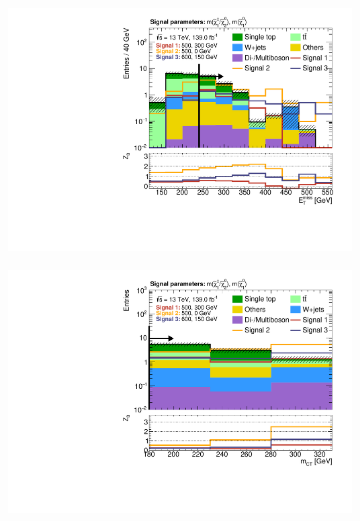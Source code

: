 \begin{figure}
	\centering
	\begin{subfigure}[b]{0.4\linewidth}
		\centering\includegraphics[width=\textwidth]{n1_SRMM_mct_bins/met.pdf}
		\caption{\label{fig:Wh_reopt_second_round_n1_srmm_met}}
	\end{subfigure}%
	\begin{subfigure}[b]{0.4\linewidth}
		\centering\includegraphics[width=\textwidth]{n1_SRMM_mct_bins/mct.pdf}
		\caption{\label{fig:Wh_reopt_second_round_n1_srmm_mct}}
	\end{subfigure}
	\begin{subfigure}[b]{0.4\linewidth}

\end{subfigure}
\end{figure}
